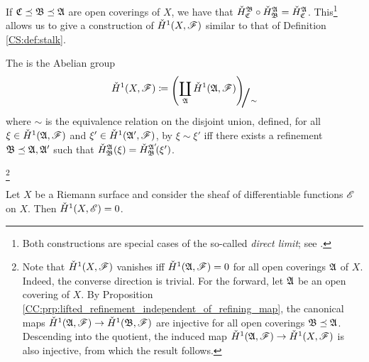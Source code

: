 \documentclass[../Moduli_Spaces_of_Riemann_Surfaces.tex]{subfiles}
\begin{document}
    \begin{remark}
        If $\mathfrak{C}\preceq\mathfrak{B}\preceq\mathfrak{A}$ are open coverings of $X$, we have that $\check{H}^{\mathfrak{B}}_{\mathfrak{C}}\circ\check{H}^{\mathfrak{A}}_{\mathfrak{B}}=\check{H}^{\mathfrak{A}}_{\mathfrak{C}}$. This\footnote{Both constructions are special cases of the so-called \textit{direct limit}; see \cite[][Chapter III]{maclane}.} allows us to give a construction of $\check{H}^1\!\left(X,\mathscr{F}\right)$ similar to that of Definition \ref{CS:def:stalk}.\exqed
    \end{remark}
    \begin{definition}
        The  is the Abelian group
        \begin{equation*}
            \check{H}^1\!\l(X,\ms{F}\r)\coloneqq\raisebox{-2pt}{$\Biggl(\!$}\coprod_{\mf{A}}\check{H}^1\!\l(\mf{A},\ms{F}\r)\!\raisebox{-2pt}{$\Biggr)$}\!\!_{\scalebox{2}{/}\sim}
        \end{equation*}
        where $\sim$ is the equivalence relation on the disjoint union, defined, for all $\xi\in\check{H}^1\!\left(\mathfrak{A},\mathscr{F}\right)$ and $\xi'\in\check{H}^1\!\left(\mathfrak{A}',\mathscr{F}\right)$, by $\xi\sim\xi'$ iff there exists a refinement $\mathfrak{B}\preceq\mathfrak{A},\mathfrak{A}'$ such that $\check{H}^{\mathfrak{A}}_{\mathfrak{B}}\!\left(\xi\right)=\check{H}^{\mathfrak{A}'}_{\mathfrak{B}}\!\!\left(\xi'\right)$.
    \end{definition}
    \footnote{Note that $\check{H}^1\!\left(X,\mathscr{F}\right)$ vanishes iff $\check{H}^1\!\left(\mathfrak{A},\mathscr{F}\right)=0$ for all open coverings $\mathfrak{A}$ of $X$. Indeed, the converse direction is trivial. For the forward, let $\mathfrak{A}$ be an open covering of $X$. By Proposition \ref{CC:prp:lifted_refinement_independent_of_refining_map}, the canonical maps $\check{H}^1\!\left(\mathfrak{A},\mathscr{F}\right)\to\check{H}^1\!\left(\mathfrak{B},\mathscr{F}\right)$ are injective for all open coverings $\mathfrak{B}\preceq\mathfrak{A}$. Descending into the quotient, the induced map $\check{H}^1\!\left(\mathfrak{A},\mathscr{F}\right)\to\check{H}^1\!\left(X,\mathscr{F}\right)$ is also injective, from which the result follows.}
    \vspace{-0.05in}
    \begin{proposition}\label{prp:3.2:vanishing_of_sheaf_differentiable}
        Let $X$ be a Riemann surface and consider the sheaf of differentiable functions $\mathscr{E}$ on $X$. Then $\check{H}^1\!\left(X,\mathscr{E}\right)=0$.
    \end{proposition}
\end{document}
